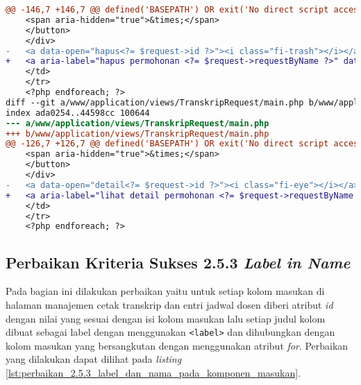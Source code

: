 \begin{lstlisting}[frame=single, label={lst:perbaikan_2.4.4_tautan_tanpa_keterangan}, language=diff, caption=Perbaikan Kriteria Sukses 2.4.4 - Tautan Tanpa Keterangan]
@@ -146,7 +146,7 @@ defined('BASEPATH') OR exit('No direct script access allowed');
    <span aria-hidden="true">&times;</span>
    </button>
    </div>
-   <a data-open="hapus<?= $request->id ?>"><i class="fi-trash"></i></a>
+   <a aria-label="hapus permohonan <?= $request->requestByName ?>" data-open="hapus<?= $request->id ?>"><i class="fi-trash"></i></a>
    </td>
    </tr>
    <?php endforeach; ?>
diff --git a/www/application/views/TranskripRequest/main.php b/www/application/views/TranskripRequest/main.php
index ada0254..44598cc 100644
--- a/www/application/views/TranskripRequest/main.php
+++ b/www/application/views/TranskripRequest/main.php
@@ -126,7 +126,7 @@ defined('BASEPATH') OR exit('No direct script access allowed');
    <span aria-hidden="true">&times;</span>
    </button>
    </div>
-   <a data-open="detail<?= $request->id ?>"><i class="fi-eye"></i></a>
+   <a aria-label="lihat detail permohonan <?= $request->requestByName ?>" data-open="detail<?= $request->id ?>"><i class="fi-eye"></i></a>
    </td>
    </tr>
    <?php endforeach; ?>
\end{lstlisting}

\subsection{Perbaikan Kriteria Sukses 2.5.3 \textit{Label in Name}}
\label{subsec:perbaikan_kriteria_sukses_2.5.3}
Pada bagian ini dilakukan perbaikan yaitu untuk setiap kolom masukan di halaman manajemen cetak transkrip dan entri jadwal dosen diberi atribut \textit{id} dengan nilai yang sesuai dengan isi kolom masukan lalu setiap judul kolom dibuat sebagai label dengan menggunakan \texttt{<label>} dan dihubungkan dengan kolom masukan yang bersangkutan dengan menggunakan atribut \textit{for}. Perbaikan yang dilakukan dapat dilihat pada \textit{listing} \ref{lst:perbaikan_2.5.3_label_dan_nama_pada_komponen_masukan}.

